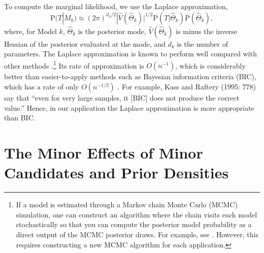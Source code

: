 \documentclass[11pt,titlepage]{article}
\renewcommand{\P}{\text{P}}
\begin{document}
To compute the marginal likelihood, we use the Laplace approximation,
\begin{equation}
  \P(T|M_k) \approx (2 \pi)^{{d_k}/2}|\widehat V(\hat\Theta_k)|^{1/2}
  \P(T|\hat{\Theta}_k) \P(\hat{\Theta}_k),
\end{equation}
where, for Model $k$, $\hat{\Theta}_k$ is the posterior mode, $\hat
V(\hat\Theta_k)$ is minus the inverse Hessian of the posterior
evaluated at the mode, and $d_k$ is the number of parameters.  The
Laplace approximation is known to perform well compared with other
methods
\citep{raft:96,lewi:raft:97,dici:kass:raft:wass:97}.\footnote{If a
  model is estimated through a Markov chain Monte Carlo (MCMC)
  simulation, one can construct an algorithm where the chain visits
  each model stochastically so that you can compute the posterior
  model probability as a direct output of the MCMC posterior draws.
  For example, see \citet{chib:95}.  However, this requires
  constructing a new MCMC algorithm for each application.}  Its rate
of approximation is $O(n^{-1})$, which is considerably better than
easier-to-apply methods such as Bayesian information criteria (BIC),
which has a rate of only $O(n^{-1/2})$ \citep{kass:tier:kada:89}.  For
example, Kass and Raftery (1995: 778) say that ``even for very large
samples, it [BIC] does not produce the correct value.''  Hence, in our
application the Laplace approximation is more appropriate than BIC.

\section{The Minor Effects of Minor Candidates and Prior Densities}\label{a:sens}
\end{document}
